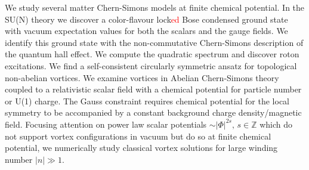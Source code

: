 


\begin{abstracts}        %

\begin{singlespace}
    We study several matter Chern-Simons models at finite chemical potential. In the SU(N) theory we discover a color-flavour lock\textcolor{red}{ed} Bose condensed ground state with vacuum expectation values for both the scalars and the gauge fields. We identify this ground state with the non-commutative Chern-Simons description of the quantum hall effect. We compute the quadratic spectrum and discover roton excitations. We find a self-consistent circularly symmetric ansatz for topological non-abelian vortices. We examine vortices in Abelian Chern-Simons theory coupled to a relativistic scalar field with a chemical potential for particle number or U(1) charge. The Gauss constraint requires chemical potential for the local symmetry to be accompanied by a constant background charge density/magnetic field. Focusing attention on power law scalar potentials $∼ |\Phi|^{2s}, \, s\in \mathbb{Z}$ which do not support vortex configurations in vacuum but do so at finite chemical potential, we numerically study classical vortex solutions for large winding number $|n|\gg  1$.
\end{singlespace}

\end{abstracts}


